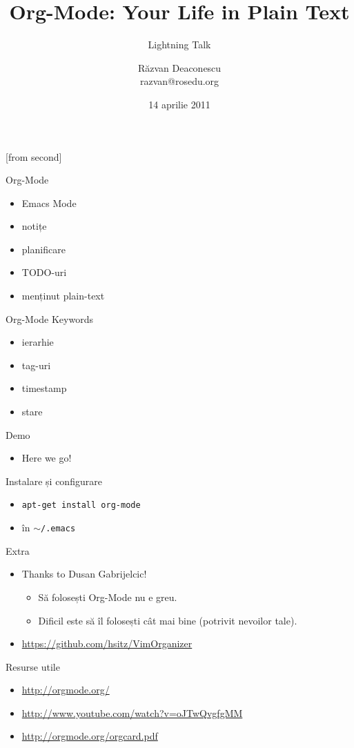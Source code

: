 \documentclass{beamer}
\title[Org-Mode]{Org-Mode: Your Life in Plain Text}
\subtitle{Lightning Talk}
\institute{Întâlnirile RLUG -- Aprilie 2011}
\author[Răzvan Deaconescu]{Răzvan Deaconescu\\
	razvan@rosedu.org}
\date{14 aprilie 2011}
\begin{document}
[from second]

\frame{\titlepage}

\begin{frame}{Org-Mode}
  \begin{itemize}
    \item Emacs Mode
    \item notițe
    \item planificare
    \item TODO-uri
    \item menținut plain-text
  \end{itemize}
\end{frame}

\begin{frame}{Org-Mode Keywords}
  \begin{itemize}
    \item ierarhie
    \item tag-uri
    \item timestamp
    \item stare
  \end{itemize}
\end{frame}

\begin{frame}{Demo}
  \begin{itemize}
    \item Here we go!
  \end{itemize}
\end{frame}

\begin{frame}{Instalare și configurare}
  \begin{itemize}
    \item \texttt{apt-get install org-mode}
    \item în \texttt{$\sim$/.emacs}
  \end{itemize}
  \begin{beamerboxesrounded}[lower=block body,shadow=true]{}
    \scriptsize 
  \end{beamerboxesrounded}
\end{frame}

\begin{frame}{Extra}
  \begin{itemize}
    \item Thanks to Dusan Gabrijelcic!
      \begin{itemize}
        \item Să folosești Org-Mode nu e greu.
        \item Dificil este să îl folosești cât mai bine (potrivit nevoilor
        tale).
      \end{itemize}
    \item \url{https://github.com/hsitz/VimOrganizer}
  \end{itemize}
\end{frame}

\begin{frame}{Resurse utile}
	\begin{itemize}
        \item \url{http://orgmode.org/}
		\item \url{http://www.youtube.com/watch?v=oJTwQvgfgMM}
        \item \url{http://orgmode.org/orgcard.pdf}
    \end{itemize}
\end{frame}
\end{document}
